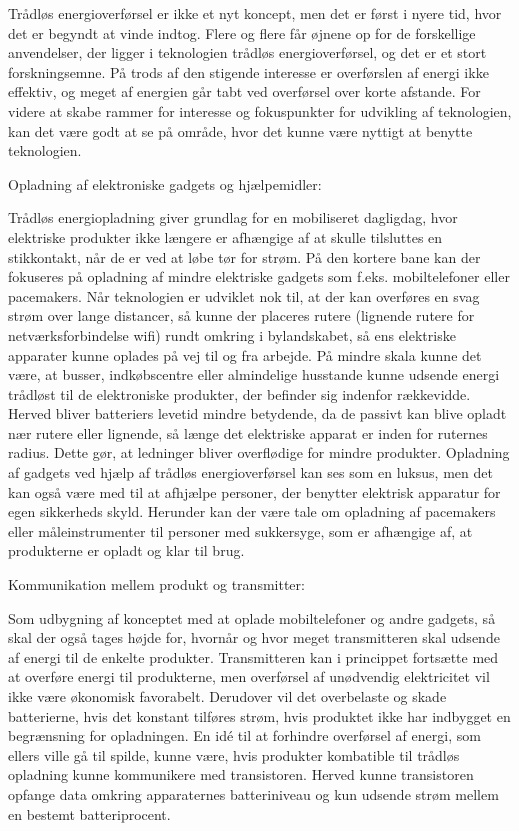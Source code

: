 Trådløs energioverførsel er ikke et nyt koncept, men det er først i nyere tid, hvor det er begyndt at vinde indtog. Flere og flere får øjnene op for de forskellige anvendelser, der ligger i teknologien trådløs energioverførsel, og det er et stort forskningsemne. På trods af den stigende interesse er overførslen af energi ikke effektiv, og meget af energien går tabt ved overførsel over korte afstande. For videre at skabe rammer for interesse og fokuspunkter for udvikling af teknologien, kan det være godt at se på område, hvor det kunne være nyttigt at benytte teknologien.

Opladning af elektroniske gadgets og hjælpemidler:
 	
Trådløs energiopladning giver grundlag for en mobiliseret dagligdag, hvor elektriske produkter ikke længere er afhængige af at skulle tilsluttes en stikkontakt, når de er ved at løbe tør for strøm. På den kortere bane kan der fokuseres på opladning af mindre elektriske gadgets som f.eks. mobiltelefoner eller pacemakers. Når teknologien er udviklet nok til, at der kan overføres en svag strøm over lange distancer, så kunne der placeres rutere (lignende rutere for netværksforbindelse wifi) rundt omkring i bylandskabet, så ens elektriske apparater kunne oplades på vej til og fra arbejde. På mindre skala kunne det være, at busser, indkøbscentre eller almindelige husstande kunne udsende energi trådløst til de elektroniske produkter, der befinder sig indenfor rækkevidde. Herved bliver batteriers levetid mindre betydende, da de passivt kan blive opladt nær rutere eller lignende, så længe det elektriske apparat er inden for ruternes radius. Dette gør, at ledninger bliver overflødige for mindre produkter. Opladning af gadgets ved hjælp af trådløs energioverførsel kan ses som en luksus, men det kan også være med til at afhjælpe personer, der benytter elektrisk apparatur for egen sikkerheds skyld. Herunder kan der være tale om opladning af pacemakers eller måleinstrumenter til personer med sukkersyge, som er afhængige af, at produkterne er opladt og klar til brug.

Kommunikation mellem produkt og transmitter:
 	
Som udbygning af konceptet med at oplade mobiltelefoner og andre gadgets, så skal der også tages højde for, hvornår og hvor meget transmitteren skal udsende af energi til de enkelte produkter. Transmitteren kan i princippet fortsætte med at overføre energi til produkterne, men overførsel af unødvendig elektricitet vil ikke være økonomisk favorabelt. Derudover vil det overbelaste og skade batterierne, hvis det konstant tilføres strøm, hvis produktet ikke har indbygget en begrænsning for opladningen. En idé til at forhindre overførsel af energi, som ellers ville gå til spilde, kunne være, hvis produkter kombatible til trådløs opladning kunne kommunikere med transistoren. Herved kunne transistoren opfange data omkring apparaternes batteriniveau og kun udsende strøm mellem en bestemt batteriprocent.

